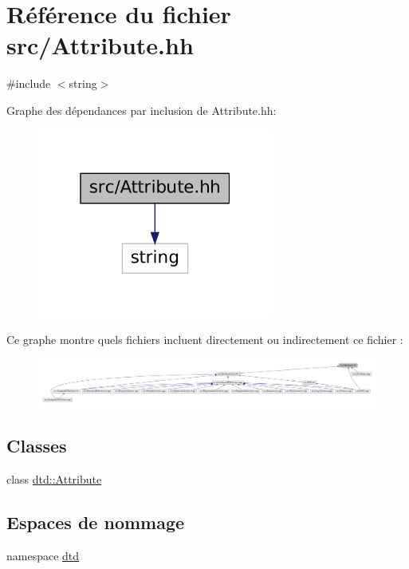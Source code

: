\hypertarget{_attribute_8hh}{
\section{Référence du fichier src/Attribute.hh}
\label{_attribute_8hh}
}
{\ttfamily \#include $<$string$>$}\par
Graphe des dépendances par inclusion de Attribute.hh:\nopagebreak
\begin{figure}[H]
\begin{center}
\leavevmode
\includegraphics[width=220pt]{_attribute_8hh__incl}
\end{center}
\end{figure}
Ce graphe montre quels fichiers incluent directement ou indirectement ce fichier :\nopagebreak
\begin{figure}[H]
\begin{center}
\leavevmode
\includegraphics[width=400pt]{_attribute_8hh__dep__incl}
\end{center}
\end{figure}
\subsection*{Classes}
\begin{DoxyCompactItemize}
\item 
class \hyperlink{classdtd_1_1_attribute}{dtd::Attribute}
\end{DoxyCompactItemize}
\subsection*{Espaces de nommage}
\begin{DoxyCompactItemize}
\item 
namespace \hyperlink{namespacedtd}{dtd}
\end{DoxyCompactItemize}
